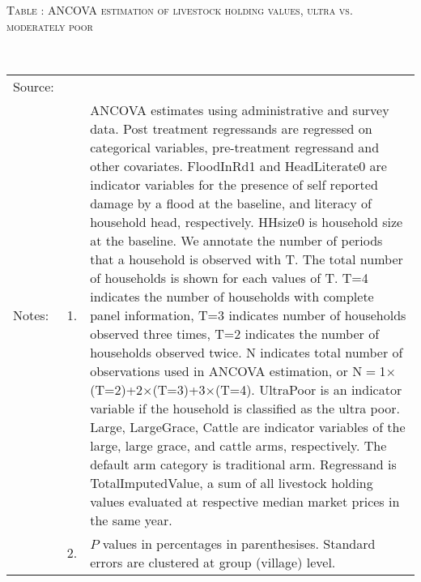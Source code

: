 \hspace{-1cm}\begin{minipage}[t]{14cm}
\hfil\textsc{\normalsize Table \thetable: ANCOVA estimation of livestock holding values, ultra vs. moderately poor\label{tab ANCOVA livestock poor}}\\
\setlength{\tabcolsep}{1pt}
\setlength{\baselineskip}{8pt}
\renewcommand{\arraystretch}{.55}
\hfil{}\\
\renewcommand{\arraystretch}{.8}
\setlength{\tabcolsep}{1pt}
\begin{tabular}{>{\hfill\scriptsize}p{1cm}<{}>{\hfill\scriptsize}p{.25cm}<{}>{\scriptsize}p{12cm}<{\hfill}}
Source:& \multicolumn{2}{l}{\scriptsize Estimated with GUK administrative and survey data.}\\
Notes: & 1. & ANCOVA estimates using administrative and survey data. Post treatment regressands are regressed on categorical variables, pre-treatment regressand and other covariates. \textsf{FloodInRd1} and \textsf{HeadLiterate0} are indicator variables for the presence of self reported damage by a flood at the baseline, and literacy of household head, respectively. \textsf{HHsize0} is household size at the baseline. We annotate the number of periods that a household is observed with \textsf{T}. The total number of households is shown for each values of \textsf{T}. \textsf{T=4} indicates the number of households with complete panel information, \textsf{T=3} indicates number of households observed three times, \textsf{T=2} indicates the number of households observed twice. \textsf{N} indicates total number of observations used in ANCOVA estimation, or \textsf{N$=$1$\times$(T=2)+2$\times$(T=3)+3$\times$(T=4)}.  \textsf{UltraPoor} is an indicator variable if the household is classified as the ultra poor. \textsf{Large}, \textsf{LargeGrace}, \textsf{Cattle} are indicator variables of the \textsf{large}, \textsf{large grace}, and \textsf{cattle} arms, respectively. The default arm category is \textsf{traditional} arm. Regressand is \textsf{TotalImputedValue}, a sum of all livestock holding values evaluated at respective median market prices in the same year. \\
& 2. & $P$ values in percentages in parenthesises. Standard errors are clustered at group (village) level.
\end{tabular}
\end{minipage}

